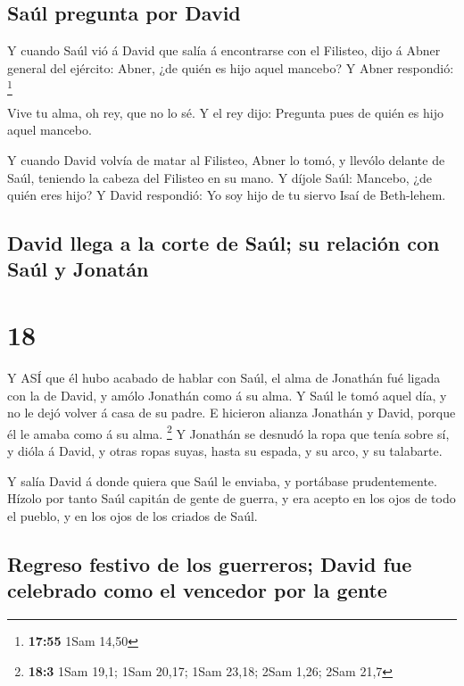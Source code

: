 \hypertarget{sauxfal-pregunta-por-david}{%
\subsection{Saúl pregunta por David}\label{sauxfal-pregunta-por-david}}

 Y cuando Saúl vió á David que salía á encontrarse con el
Filisteo, dijo á Abner general del ejército: Abner, ¿de quién es hijo
aquel mancebo? Y Abner respondió: \footnote{\textbf{17:55} 1Sam 14,50}

 Vive tu alma, oh rey, que no lo sé. Y el rey dijo:
Pregunta pues de quién es hijo aquel mancebo.

 Y cuando David volvía de matar al Filisteo, Abner lo tomó,
y llevólo delante de Saúl, teniendo la cabeza del Filisteo en su mano.
 Y díjole Saúl: Mancebo, ¿de quién eres hijo? Y David
respondió: Yo soy hijo de tu siervo Isaí de Beth-lehem.

\hypertarget{david-llega-a-la-corte-de-sauxfal-su-relaciuxf3n-con-sauxfal-y-jonatuxe1n}{%
\subsection{David llega a la corte de Saúl; su relación con Saúl y
Jonatán}\label{david-llega-a-la-corte-de-sauxfal-su-relaciuxf3n-con-sauxfal-y-jonatuxe1n}}

\hypertarget{section-17}{%
\section{18}\label{section-17}}

 Y ASÍ que él hubo acabado de hablar con Saúl, el alma de
Jonathán fué ligada con la de David, y amólo Jonathán como á su alma.
 Y Saúl le tomó aquel día, y no le dejó volver á casa de su
padre.  E hicieron alianza Jonathán y David, porque él le
amaba como á su alma. \footnote{\textbf{18:3} 1Sam 19,1; 1Sam 20,17;
  1Sam 23,18; 2Sam 1,26; 2Sam 21,7}  Y Jonathán se desnudó
la ropa que tenía sobre sí, y dióla á David, y otras ropas suyas, hasta
su espada, y su arco, y su talabarte.

 Y salía David á donde quiera que Saúl le enviaba, y
portábase prudentemente. Hízolo por tanto Saúl capitán de gente de
guerra, y era acepto en los ojos de todo el pueblo, y en los ojos de los
criados de Saúl.

\hypertarget{regreso-festivo-de-los-guerreros-david-fue-celebrado-como-el-vencedor-por-la-gente}{%
\subsection{Regreso festivo de los guerreros; David fue celebrado como
el vencedor por la
gente}\label{regreso-festivo-de-los-guerreros-david-fue-celebrado-como-el-vencedor-por-la-gente}}

